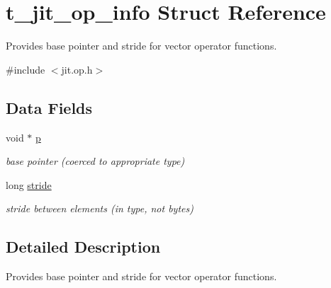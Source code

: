 \hypertarget{structt__jit__op__info}{
\section{t\_\-jit\_\-op\_\-info Struct Reference}
\label{structt__jit__op__info}
}


Provides base pointer and stride for vector operator functions.  


{\ttfamily \#include $<$jit.op.h$>$}\subsection*{Data Fields}
\begin{DoxyCompactItemize}
\item 
\hypertarget{structt__jit__op__info_ad7cb4f68665c446670205108cc92056b}{
void $\ast$ \hyperlink{structt__jit__op__info_ad7cb4f68665c446670205108cc92056b}{p}}
\label{structt__jit__op__info_ad7cb4f68665c446670205108cc92056b}

\begin{DoxyCompactList}\small\item\em base pointer (coerced to appropriate type) \item\end{DoxyCompactList}\item 
\hypertarget{structt__jit__op__info_ae24aa709b13d02bd1d7c5d80d04999fd}{
long \hyperlink{structt__jit__op__info_ae24aa709b13d02bd1d7c5d80d04999fd}{stride}}
\label{structt__jit__op__info_ae24aa709b13d02bd1d7c5d80d04999fd}

\begin{DoxyCompactList}\small\item\em stride between elements (in type, not bytes) \item\end{DoxyCompactList}\end{DoxyCompactItemize}


\subsection{Detailed Description}
Provides base pointer and stride for vector operator functions. 